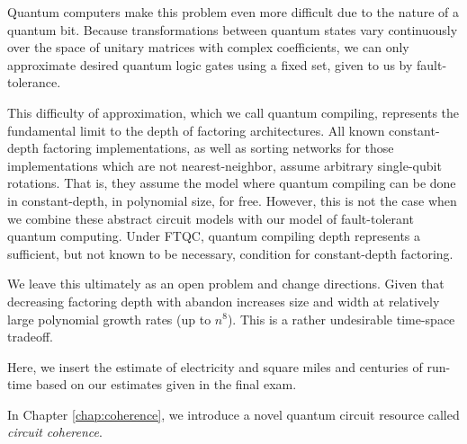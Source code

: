 Quantum computers make this problem even more difficult due to the nature of a quantum bit. Because transformations between quantum states vary continuously over the space of unitary matrices with complex coefficients, we can only approximate desired quantum logic gates using a fixed set, given to us by fault-tolerance.

This difficulty of approximation, which we call quantum compiling, represents the fundamental limit to the depth of factoring architectures. All known constant-depth factoring implementations, as well as sorting networks for those implementations which are not nearest-neighbor, assume arbitrary single-qubit rotations. That is, they assume the model where quantum compiling can be done in constant-depth, in polynomial size, for free. However, this is not the case when we combine these abstract circuit models with our model of fault-tolerant quantum computing. Under FTQC, quantum compiling depth represents a sufficient, but not known to be necessary, condition for constant-depth factoring. 

We leave this ultimately as an open problem and change directions.
Given that decreasing factoring depth with abandon increases size and width at relatively large polynomial growth rates (up to $n^8$). This is a rather undesirable time-space tradeoff.

Here, we insert the estimate of electricity and square miles and centuries of run-time based on our estimates given in the final exam.

In Chapter \ref{chap:coherence}, we introduce a novel quantum circuit resource called \emph{circuit coherence}.
